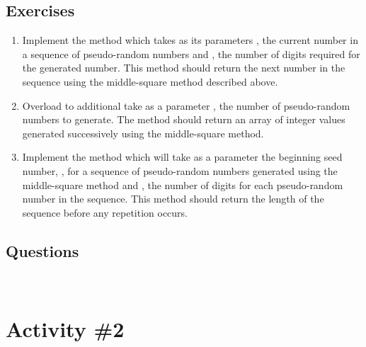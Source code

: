 	  \subsection{Exercises}
	    \begin{enumerate}
	      \item Implement the  method which takes as its parameters , the current number in a sequence of pseudo-random numbers and , the number of digits required for the generated number. This method should return the next number in the sequence using the middle-square method described above.
	      \item Overload  to additional take as a parameter , the number of pseudo-random numbers to generate. The method should return an array of integer values generated successively using the middle-square method.
	      \item Implement the  method which will take as a parameter the beginning seed number, , for a sequence of pseudo-random numbers generated using the middle-square method and , the number of digits for each pseudo-random number in the sequence. This method should return the length of the sequence before any repetition occurs.
	    \end{enumerate}

  \pagebreak

	  \subsection{Questions}
	    \ \\[9pt]

  \pagebreak

	\section{Activity \#2}
